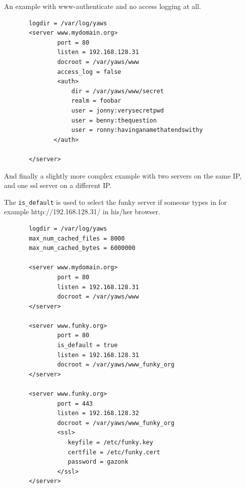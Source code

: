 \documentclass[11pt,oneside,english]{book}
\begin{document}
An example with www-authenticate and no access logging at all.

\begin{verbatim}
       logdir = /var/log/yaws
       <server www.mydomain.org>
               port = 80
               listen = 192.168.128.31
               docroot = /var/yaws/www
               access_log = false
               <auth>
                   dir = /var/yaws/www/secret
                   realm = foobar
                   user = jonny:verysecretpwd
                   user = benny:thequestion
                   user = ronny:havinganamethatendswithy
              </auth>

       </server>
\end{verbatim}

       And  finally  a  slightly more complex example with
       two servers on the same IP, and one ssl server on a
       different IP.

       The \verb+is_default+ is used to select the funky server if
       someone types in for example http://192.168.128.31/ in his/her
       browser.


\begin{verbatim}
       logdir = /var/log/yaws
       max_num_cached_files = 8000
       max_num_cached_bytes = 6000000

       <server www.mydomain.org>
               port = 80
               listen = 192.168.128.31
               docroot = /var/yaws/www
       </server>

       <server www.funky.org>
               port = 80
               is_default = true
               listen = 192.168.128.31
               docroot = /var/yaws/www_funky_org
       </server>

       <server www.funky.org>
               port = 443
               listen = 192.168.128.32
               docroot = /var/yaws/www_funky_org
               <ssl>
                  keyfile = /etc/funky.key
                  certfile = /etc/funky.cert
                  password = gazonk
               </ssl>
       </server>
\end{verbatim}
\end{document}
